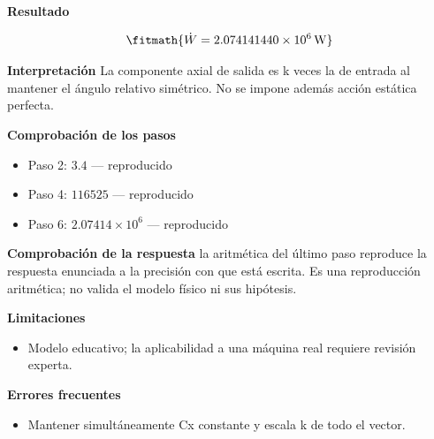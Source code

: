 \documentclass[10pt,openany]{book}
\begin{document}
\begin{tcolorbox}[title={Problema resuelto 3}, studiumworked, breakable]
\noindent\textbf{Resultado}

\[
\fitmath{\dot{W}=2.074141440\times10^{6}\,\mathrm{W}}
\]

\noindent\textbf{Interpretación}
La componente axial de salida es k veces la de entrada al mantener el ángulo relativo simétrico. No se impone además acción estática perfecta.

\noindent\textbf{Comprobación de los pasos}
\begin{itemize}
\item Paso 2: $3.4$ — reproducido
\item Paso 4: $116525$ — reproducido
\item Paso 6: $2.07414\times 10^{6}$ — reproducido
\end{itemize}

\noindent\textbf{Comprobación de la respuesta} la aritmética del último paso reproduce la respuesta enunciada a la precisión con que está escrita. Es una reproducción aritmética; no valida el modelo físico ni sus hipótesis.

\noindent\textbf{Limitaciones}
\begin{itemize}
\item Modelo educativo; la aplicabilidad a una máquina real requiere revisión experta.
\end{itemize}

\noindent\textbf{Errores frecuentes}
\begin{itemize}
\item Mantener simultáneamente Cx constante y escala k de todo el vector.
\end{itemize}
\end{tcolorbox}
\end{document}

